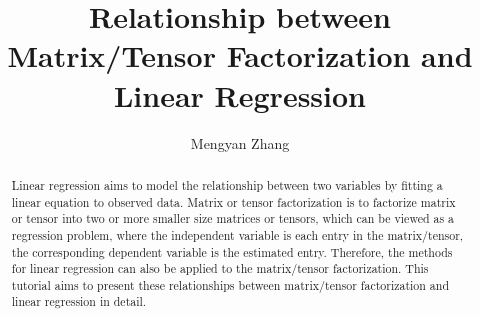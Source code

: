 \documentclass[11pt,a4paper]{article}
\title{Relationship between Matrix/Tensor Factorization and Linear Regression}
\author{Mengyan Zhang}
\begin{document}
\maketitle

\begin{abstract}
Linear regression aims to model the relationship between two variables by fitting a linear equation to observed data. Matrix or tensor factorization is to factorize matrix or tensor into two or more smaller size matrices or tensors, which can be viewed as a regression problem, where the independent variable is each entry in the matrix/tensor, the corresponding dependent variable is the estimated entry. Therefore, the methods for linear regression can also be applied to the matrix/tensor factorization. This tutorial aims to present these relationships between matrix/tensor factorization and linear regression in detail.
\end{abstract}


\end{document}
